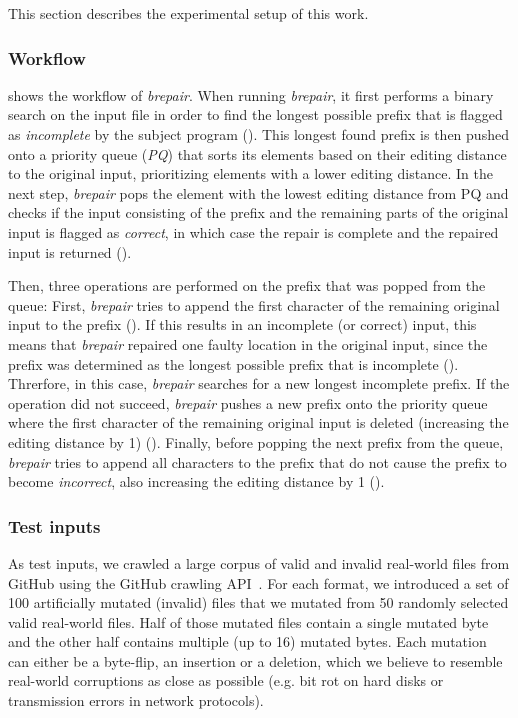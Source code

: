 \documentclass[sigconf,review,anonymous]{acmart}
\newcommand{\brepair}{\textit{brepair}\xspace}
\begin{document}
This section describes the experimental setup of this work. 

\subsubsection*{\bf Workflow}
 shows the workflow of \brepair.
When running \brepair, it first performs a binary search on the input file in order to find the longest possible prefix that is flagged as \emph{incomplete} by the subject program ().
This longest found prefix is then pushed onto a priority queue (\emph{PQ}) that sorts its elements based on their editing distance to the original input, prioritizing elements with a lower editing distance.
In the next step, \brepair pops the element with the lowest editing distance from PQ and checks if the input consisting of the prefix and the remaining parts of the original input is flagged as \emph{correct}, in which case the repair is complete and the repaired input is returned ().\par
Then, three operations are performed on the prefix that was popped from the queue:
First, \brepair tries to append the first character of the remaining original input to the prefix ().
If this results in an incomplete (or correct) input, this means that \brepair repaired one faulty location in the original input, since the prefix was determined as the longest possible prefix that is incomplete ().
Threrfore, in this case, \brepair searches for a new longest incomplete prefix.
If the operation did not succeed, \brepair pushes a new prefix onto the priority queue where the first character of the remaining original input is deleted (increasing the editing distance by 1) ().
Finally, before popping the next prefix from the queue, \brepair tries to append all characters to the prefix that do not cause the prefix to become \emph{incorrect}, also increasing the editing distance by 1 ().

\subsubsection*{\bf Test inputs}
As test inputs, we crawled a large corpus of valid and invalid real-world files from GitHub using the GitHub crawling API~\cite{githubapi}.
For each format, we introduced a set of 100 artificially mutated (invalid) files that we mutated from 50 randomly selected valid real-world files.
Half of those mutated files contain a single mutated byte and the other half contains multiple (up to 16) mutated bytes.
Each mutation can either be a byte-flip, an insertion or a deletion, which we believe to resemble real-world corruptions as close as possible (e.g. bit rot on hard disks or transmission errors in network protocols).
\end{document}
